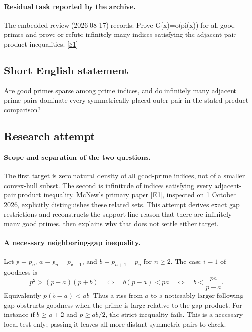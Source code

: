 \documentclass[11pt,a4paper]{article}
\newcommand{\sref}[2]{\hyperlink{source:#1:#2}{[S#2]}}
\begin{document}
\paragraph{Residual task reported by the archive.}

The embedded review (2026-08-17) records: Prove G(x)=o(pi(x)) for all good primes and prove or refute infinitely many indices satisfying the adjacent-pair product inequalities. \sref{1867}{1}

\subsection{Short English statement}

Are good primes sparse among prime indices, and do infinitely many adjacent prime pairs dominate every symmetrically placed outer pair in the stated product comparison?

\subsection{Research attempt}

\paragraph{Scope and separation of the two questions.}
The first target is zero natural density of all good-prime indices,
not of a smaller convex-hull subset. The second is infinitude of
indices satisfying every adjacent-pair product inequality. McNew's
primary paper [E1], inspected on 1 October 2026, explicitly distinguishes
these related sets. This attempt derives exact gap restrictions and
reconstructs the support-line reason that there are infinitely many
good primes, then explains why that does not settle either target.

\paragraph{A necessary neighboring-gap inequality.}
Let $p=p_n$, $a=p_n-p_{n-1}$, and $b=p_{n+1}-p_n$ for $n\ge2$.
The case $i=1$ of goodness is
\[
 p^2>(p-a)(p+b)
 \quad\Longleftrightarrow\quad b(p-a)<pa
 \quad\Longleftrightarrow\quad b<\frac{pa}{p-a}.
\]
Equivalently $p(b-a)<ab$. Thus a rise from $a$ to a noticeably
larger following gap obstructs goodness when the prime is large
relative to the gap product. For instance if $b\ge a+2$ and
$p\ge ab/2$, the strict inequality fails. This is a necessary local
test only; passing it leaves all more distant symmetric pairs to check.
\end{document}
